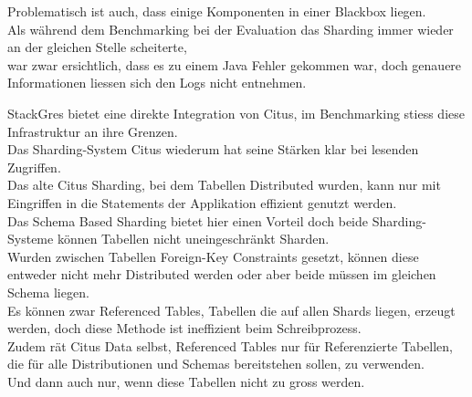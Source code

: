 \begin{flushleft}
    Problematisch ist auch, dass einige Komponenten in einer Blackbox liegen.\\
    Als während dem Benchmarking bei der Evaluation das Sharding immer wieder an der gleichen Stelle scheiterte,\\
    war zwar ersichtlich, dass es zu einem Java Fehler gekommen war, doch genauere Informationen liessen sich den Logs nicht entnehmen.\\
\end{flushleft}
\begin{flushleft}
    StackGres bietet eine direkte Integration von Citus, im Benchmarking stiess diese Infrastruktur an ihre Grenzen.\\
    Das Sharding-System Citus wiederum hat seine Stärken klar bei lesenden Zugriffen.\\
    Das alte Citus Sharding, bei dem Tabellen Distributed wurden, kann nur mit Eingriffen in die Statements der Applikation effizient genutzt werden.\\
    Das Schema Based Sharding bietet hier einen Vorteil doch beide Sharding-Systeme können Tabellen nicht uneingeschränkt Sharden.\\
    Wurden zwischen Tabellen Foreign-Key Constraints gesetzt, können diese entweder nicht mehr Distributed werden oder aber beide müssen im gleichen Schema liegen.\\
    Es können zwar Referenced Tables, Tabellen die auf allen Shards liegen, erzeugt werden, doch diese Methode ist ineffizient beim Schreibprozess.\\
    Zudem rät Citus Data selbst, Referenced Tables nur für Referenzierte Tabellen, die für alle Distributionen und Schemas bereitstehen sollen, zu verwenden.\\
    Und dann auch nur, wenn diese Tabellen nicht zu gross werden.
\end{flushleft}
